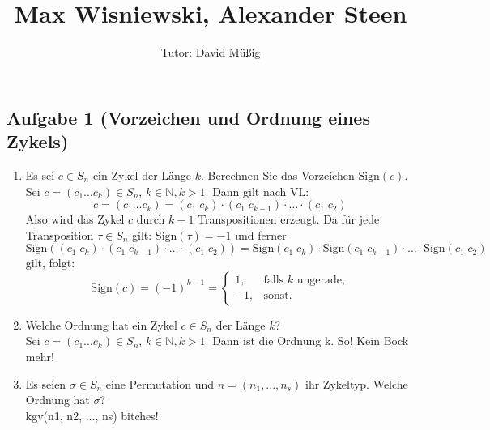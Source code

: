 \documentclass[11pt,a4paper,ngerman]{article}
\author{Tutor: David Müßig}
\date{}
\title{Max Wisniewski, Alexander Steen}
\newcommand{\N}{\mathbb{N}}
\newcommand{\sign}{\text{Sign}}
\begin{document}

\maketitle
\thispagestyle{fancy}


\subsection*{Aufgabe 1 \mdseries (Vorzeichen und Ordnung eines Zykels)}
\begin{enumerate}[\bfseries a)]
\item Es sei $c \in S_n$ ein Zykel der Länge $k$. Berechnen Sie das Vorzeichen $\sign(c)$. \\

Sei $c = (c_1 \ldots c_k) \in S_n$, $k \in \N,k > 1$. Dann gilt nach VL:
$$ c = (c_1 \ldots c_k) = (c_1 \; c_k) \cdot (c_1 \; c_{k-1}) \cdot \ldots \cdot (c_1 \; c_2)$$
Also wird das Zykel $c$ durch $k-1$ Transpositionen erzeugt. Da für jede Transposition $\tau \in S_n$ gilt: $\sign(\tau) = -1$ und ferner
$$ \sign((c_1 \; c_k) \cdot (c_1 \; c_{k-1}) \cdot \ldots \cdot (c_1 \; c_2)) = \sign(c_1 \; c_k) \cdot \sign(c_1 \; c_{k-1}) \cdot \ldots \cdot \sign(c_1 \; c_2)$$
gilt, folgt:
$$ \sign(c) = (-1)^{k-1} = \begin{cases}
  1,  & \text{falls }k\text{ ungerade,}\\
  -1, & \text{sonst.}
\end{cases} $$
\item  Welche Ordnung hat ein Zykel $c \in S_n$ der Länge $k$? \\

Sei $c = (c_1 \ldots c_k) \in S_n$, $k \in \N,k > 1$.
Dann ist die Ordnung k. So! Kein Bock mehr!
\item Es seien $\sigma \in S_n$ eine Permutation und $n=(n_1,...,n_s)$ ihr Zykeltyp. Welche Ordnung hat $\sigma$? \\
kgv(n1, n2, ..., ns) bitches!
\end{enumerate}
\end{document}

